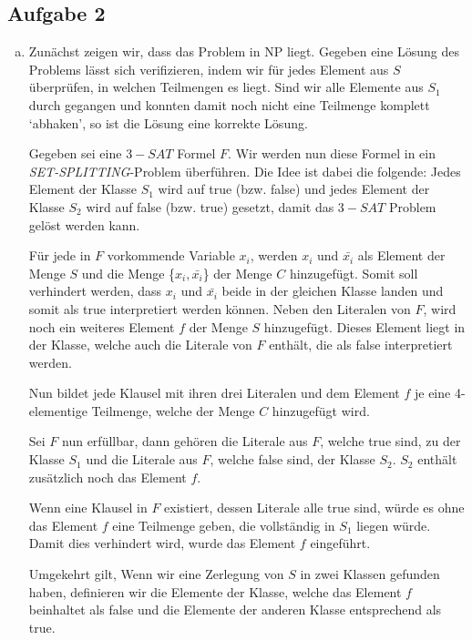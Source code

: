 \documentclass[12pt,a4paper]{article}
\begin{document}
\subsection*{Aufgabe 2}

\begin{enumerate}[a)] 
	
	\item Zunächst zeigen wir, dass das Problem in NP liegt. Gegeben eine Lösung des Problems lässt sich verifizieren, indem wir für jedes Element aus $S$ überprüfen, in welchen Teilmengen es liegt. Sind wir alle Elemente aus $S_1$ durch gegangen und konnten damit noch nicht eine Teilmenge komplett `abhaken', so ist die Lösung eine korrekte Lösung.
	
	Gegeben sei eine $3-SAT$ Formel $F$. Wir werden nun diese Formel in ein \textit{SET-SPLITTING}-Problem überführen. Die Idee ist dabei die folgende: Jedes Element der Klasse $S_1$ wird auf true (bzw. false) und jedes Element der Klasse $S_2$ wird auf false (bzw. true) gesetzt, damit das $3-SAT$ Problem gelöst werden kann.
	
	Für jede in $F$ vorkommende Variable $x_i$, werden $x_i$ und $\bar{x_i}$ als Element der Menge $S$ und die Menge \{$x_i, \bar{x_i}$\} der Menge $C$ hinzugefügt. Somit soll verhindert werden, dass $x_i$ und $\bar{x_i}$ beide in der gleichen Klasse landen und somit als true interpretiert werden können. Neben den Literalen von $F$, wird noch ein weiteres Element $f$ der Menge $S$ hinzugefügt. Dieses Element liegt in der Klasse, welche auch die Literale von $F$ enthält, die als false interpretiert werden.
	
	Nun bildet jede Klausel mit ihren drei Literalen und dem Element $f$ je eine 4-elementige Teilmenge, welche der Menge $C$ hinzugefügt wird.  
	
	Sei $F$ nun erfüllbar, dann gehören die Literale aus $F$, welche true sind, zu der Klasse $S_1$ und die Literale aus $F$, welche false sind, der Klasse $S_2$. $S_2$ enthält zusätzlich noch das Element $f$. 
	
	Wenn eine Klausel in $F$ existiert, dessen Literale alle true sind, würde es ohne das Element $f$ eine Teilmenge geben, die vollständig in $S_1$ liegen würde. Damit dies verhindert wird, wurde das Element $f$ eingeführt.
	
	Umgekehrt gilt, Wenn wir eine Zerlegung von $S$ in zwei Klassen gefunden haben, definieren wir die Elemente der Klasse, welche das Element $f$ beinhaltet als false und die Elemente der anderen Klasse entsprechend als true.
	

\end{enumerate}
\end{document}
